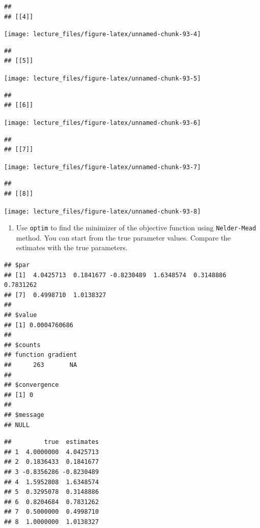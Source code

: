 \documentclass[]{book}
\providecommand{\tightlist}{%
  \setlength{\itemsep}{0pt}\setlength{\parskip}{0pt}}
\begin{document}
\begin{verbatim}
## 
## [[4]]
\end{verbatim}

\begin{center}\texttt{[image: lecture\_files/figure-latex/unnamed-chunk-93-4]} \end{center}

\begin{verbatim}
## 
## [[5]]
\end{verbatim}

\begin{center}\texttt{[image: lecture\_files/figure-latex/unnamed-chunk-93-5]} \end{center}

\begin{verbatim}
## 
## [[6]]
\end{verbatim}

\begin{center}\texttt{[image: lecture\_files/figure-latex/unnamed-chunk-93-6]} \end{center}

\begin{verbatim}
## 
## [[7]]
\end{verbatim}

\begin{center}\texttt{[image: lecture\_files/figure-latex/unnamed-chunk-93-7]} \end{center}

\begin{verbatim}
## 
## [[8]]
\end{verbatim}

\begin{center}\texttt{[image: lecture\_files/figure-latex/unnamed-chunk-93-8]} \end{center}

\begin{enumerate}
\def\labelenumi{\arabic{enumi}.}
\setcounter{enumi}{7}
\tightlist
\item
  Use \texttt{optim} to find the minimizer of the objective function
  using \texttt{Nelder-Mead} method. You can start from the true
  parameter values. Compare the estimates with the true parameters.
\end{enumerate}

\begin{verbatim}
## $par
## [1]  4.0425713  0.1841677 -0.8230489  1.6348574  0.3148886  0.7831262
## [7]  0.4998710  1.0138327
## 
## $value
## [1] 0.0004760686
## 
## $counts
## function gradient 
##      263       NA 
## 
## $convergence
## [1] 0
## 
## $message
## NULL
\end{verbatim}

\begin{verbatim}
##         true  estimates
## 1  4.0000000  4.0425713
## 2  0.1836433  0.1841677
## 3 -0.8356286 -0.8230489
## 4  1.5952808  1.6348574
## 5  0.3295078  0.3148886
## 6  0.8204684  0.7831262
## 7  0.5000000  0.4998710
## 8  1.0000000  1.0138327
\end{verbatim}


\end{document}
